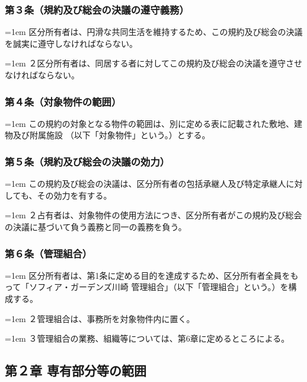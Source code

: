 \documentclass[
  twoside,
  luatex,
  paper=a4paper,
  fontsize=11pt,
  jafontsize=11pt,
  jlreq_notes,
]{jlreq}
\newcommand{\joumain}[1]{%
  \noindent\hangindent=1em\hangafter=1
  \hspace{1em}#1%
}
\newcommand{\kou}[2]{%
  \par\noindent\hangindent=1em\hangafter=1
  #1\hspace{1em}#2%
}
\begin{document}
  \subsubsection*{第３条（規約及び総会の決議の遵守義務）}
  \joumain{区分所有者は、円滑な共同生活を維持するため、この規約及び総会の決議を誠実に遵守しなければならない。}
  \kou{２}{区分所有者は、同居する者に対してこの規約及び総会の決議を遵守させなければならない。}

  \subsubsection*{第４条（対象物件の範囲）}
  \joumain{この規約の対象となる物件の範囲は、別に定める表に記載された敷地、建物及び附属施設
  （以下「対象物件」という。）とする。}

  \subsubsection*{第５条（規約及び総会の決議の効力）}
  \joumain{この規約及び総会の決議は、区分所有者の包括承継人及び特定承継人に対しても、その効力を有する。}
  \kou{２}{占有者は、対象物件の使用方法につき、区分所有者がこの規約及び総会の決議に基づいて負う義務と同一の義務を負う。}

  \subsubsection*{第６条（管理組合）}
  \joumain{区分所有者は、第1条に定める目的を達成するため、区分所有者全員をもって「ソフィア・ガーデンズ川崎
  管理組合」（以下「管理組合」という。）を構成する。}
  \kou{２}{管理組合は、事務所を対象物件内に置く。}
  \kou{３}{管理組合の業務、組織等については、第6章に定めるところによる。}

  \begin{center}
    \subsection*{第２章 専有部分等の範囲}
  \end{center}
\end{document}
